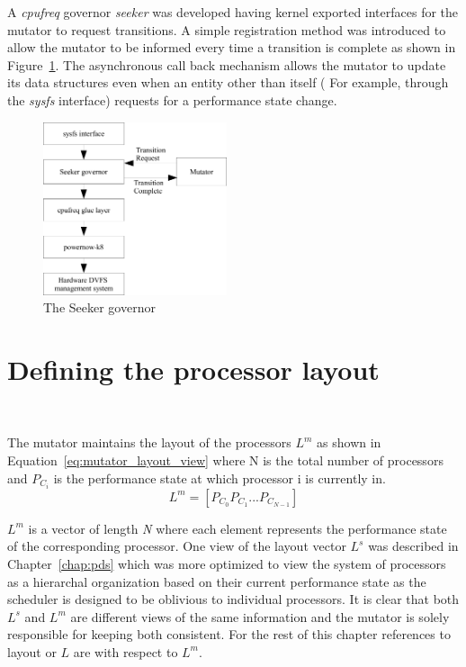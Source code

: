 A \textit{cpufreq} governor \textit{seeker}
was developed having kernel exported interfaces for the mutator to request transitions. 
A simple registration method was introduced to allow the mutator to be informed 
every time a transition is complete as shown in Figure~\ref{fig:governor}. 
The asynchronous call back mechanism allows the mutator to
update its data structures even when an entity other than itself ( For example, through
the \textit{sysfs} interface) requests for a performance state change. 

\begin{figure}[h!]
  \begin{center}
    \includegraphics[height=2in]{figures/seeker_governor.jpg}%
    \caption{The Seeker governor}
    \label{fig:governor}
  \end{center}
\end{figure}

\section{Defining the processor layout}~\label{sec:layout}

The mutator maintains the layout of the processors $L^m$ as shown in Equation~\eqref{eq:mutator_layout_view}
where N is the total number of processors and 
$P_{C_{i}}$ is the performance state at which processor i is currently in. 
\begin{equation}
    L^m = [ P_{C_{0}} P_{C_{1}} ... P_{C_{N-1}} ]
\label{eq:mutator_layout_view}
\end{equation}

$L^m$ is a vector of length \textit{N} where each element represents the performance state
of the corresponding processor. 
One view of the layout vector $L^s$ was described in Chapter~\ref{chap:pds} 
which was more optimized to view the system of processors as a hierarchal organization
based on their current performance state as the scheduler is designed to be oblivious to individual processors. 
It is clear that both $L^s$ and $L^m$ are different views of the same information and 
the mutator is solely responsible for keeping both consistent. For the rest of this chapter
references to layout or $L$ are with respect to $L^m$. 


